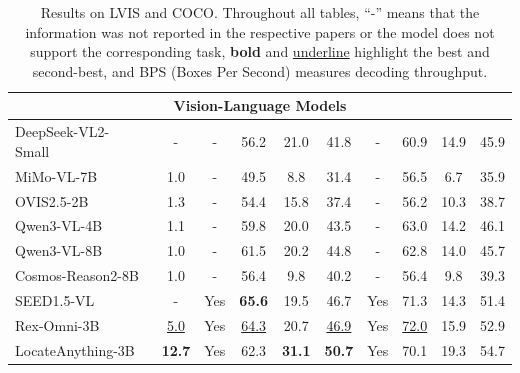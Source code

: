 \documentclass{llmxive}
\begin{document}
\begin{table}[t]
{\begin{tabular}{l|c|c|ccc|c|ccc}
\midrule
\multicolumn{10}{c}{{Vision-Language Models}} \\
\midrule
DeepSeek-VL2-Small~\citep{wu2024deepseekvl2mixtureofexpertsvisionlanguagemodels}  & - & - & 56.2 & 21.0 & 41.8 & - & 60.9 & 14.9 & 45.9 \\
MiMo-VL-7B~\citep{coreteam2025mimovltechnicalreport}          & 1.0 & - & 49.5 & 8.8  & 31.4 & - & 56.5 & 6.7  & 35.9 \\
OVIS2.5-2B~\citep{lu2025ovis25technicalreport}          & 1.3 & - & 54.4 & 15.8 & 37.4 & - & 56.2 & 10.3 & 38.7 \\
Qwen3-VL-4B~\citep{bai2025qwen3vltechnicalreport}         & 1.1 & - & 59.8 & 20.0 & 43.5 & - & 63.0 & 14.2 & 46.1 \\ 
Qwen3-VL-8B~\citep{bai2025qwen3vltechnicalreport}         & 1.0 & - & 61.5 & 20.2 & 44.8 & - & 62.8 & 14.0 & 45.7 \\ 
Cosmos-Reason2-8B~\citep{cosmosreason2}         & 1.0 & - & 56.4 & 9.8 & 40.2 & - & 56.4 & 9.8 & 39.3 \\ 
SEED1.5-VL~\citep{guo2025seed15vltechnicalreport}          & - & Yes & \textbf{65.6} & 19.5 & 46.7 & Yes & 71.3 & 14.3 & 51.4 \\
Rex-Omni-3B~\citep{jiang2025rexomni}             & \underline{5.0} & Yes & \underline{64.3} & 20.7 & \underline{46.9} & Yes & \underline{72.0} & 15.9 & 52.9 \\
\rowcolor{lightblue!10}
LocateAnything-3B      & \textbf{12.7} & Yes & 62.3 & \textbf{31.1} & \textbf{50.7} & Yes & 70.1 & 19.3 & 54.7 \\
\bottomrule
\end{tabular}
}
\caption{Results on LVIS and COCO. Throughout all tables, ``-'' means that the information was not reported in the respective papers or the model does not support the corresponding task, \textbf{bold} and \underline{underline} highlight the best and second-best, and BPS (Boxes Per Second) measures decoding throughput.}
\end{table}
\end{document}
